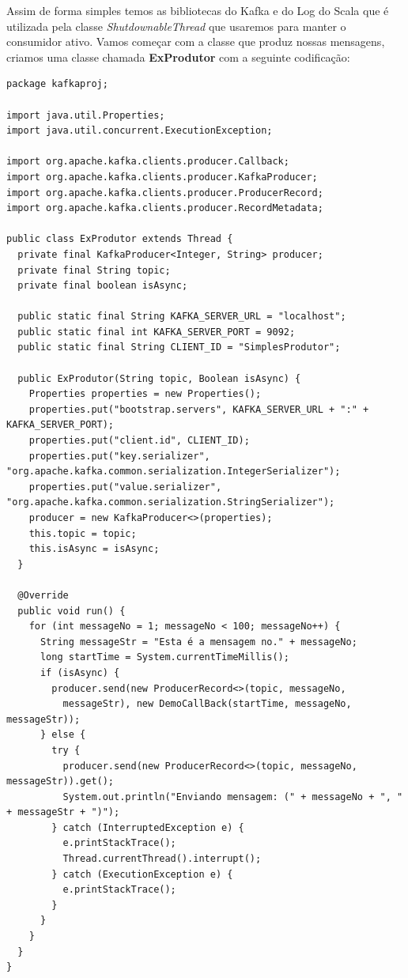 \documentclass[a4paper,11pt]{article}
\begin{document}
Assim de forma simples temos as bibliotecas do Kafka e do Log do Scala que é utilizada pela classe \textit{ShutdownableThread} que usaremos para manter o consumidor ativo. Vamos começar com a classe que produz nossas mensagens, criamos uma classe chamada \textbf{ExProdutor} com a seguinte codificação:
\begin{lstlisting}[]
package kafkaproj;

import java.util.Properties;
import java.util.concurrent.ExecutionException;

import org.apache.kafka.clients.producer.Callback;
import org.apache.kafka.clients.producer.KafkaProducer;
import org.apache.kafka.clients.producer.ProducerRecord;
import org.apache.kafka.clients.producer.RecordMetadata;
 
public class ExProdutor extends Thread {
  private final KafkaProducer<Integer, String> producer;
  private final String topic;
  private final boolean isAsync;
 
  public static final String KAFKA_SERVER_URL = "localhost";
  public static final int KAFKA_SERVER_PORT = 9092;
  public static final String CLIENT_ID = "SimplesProdutor";
 
  public ExProdutor(String topic, Boolean isAsync) {
    Properties properties = new Properties();
    properties.put("bootstrap.servers", KAFKA_SERVER_URL + ":" + KAFKA_SERVER_PORT);
    properties.put("client.id", CLIENT_ID);
    properties.put("key.serializer", "org.apache.kafka.common.serialization.IntegerSerializer");
    properties.put("value.serializer", "org.apache.kafka.common.serialization.StringSerializer");
    producer = new KafkaProducer<>(properties);
    this.topic = topic;
    this.isAsync = isAsync;
  }
 
  @Override
  public void run() {
    for (int messageNo = 1; messageNo < 100; messageNo++) {
      String messageStr = "Esta é a mensagem no." + messageNo;
      long startTime = System.currentTimeMillis();
      if (isAsync) {
        producer.send(new ProducerRecord<>(topic, messageNo,
          messageStr), new DemoCallBack(startTime, messageNo, messageStr));
      } else {
        try {
          producer.send(new ProducerRecord<>(topic, messageNo, messageStr)).get();
          System.out.println("Enviando mensagem: (" + messageNo + ", " + messageStr + ")");
        } catch (InterruptedException e) {
          e.printStackTrace();
          Thread.currentThread().interrupt();
        } catch (ExecutionException e) {
          e.printStackTrace();
        }
      }
    }
  }
}
 

\end{lstlisting}
\end{document}
